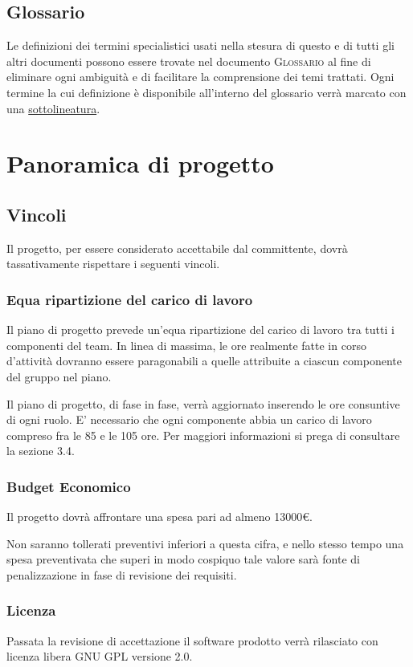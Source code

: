 \documentclass[11pt,a4paper]{article}
\begin{document}
\subsection{Glossario}
Le definizioni dei termini specialistici usati nella stesura di questo e di tutti gli altri documenti possono essere trovate nel documento \textsc{Glossario} al fine di eliminare ogni ambiguità e di facilitare la comprensione dei temi trattati. Ogni termine la cui definizione è disponibile all'interno del glossario verrà marcato con una \underline{sottolineatura}.
\section{Panoramica di progetto}
\subsection{Vincoli}
Il progetto, per essere considerato accettabile dal committente, dovrà tassativamente rispettare i seguenti vincoli.
\subsubsection{Equa ripartizione del carico di lavoro}
Il piano di progetto prevede un'equa ripartizione del carico di lavoro tra tutti i componenti del team.
In linea di massima, le ore realmente fatte in corso d'attività dovranno essere paragonabili a quelle attribuite a ciascun componente del gruppo nel piano.

Il piano di progetto, di fase in fase, verrà aggiornato inserendo le ore consuntive di ogni ruolo.
E' necessario che ogni componente abbia un carico di lavoro compreso fra le 85 e le 105 ore. Per maggiori informazioni si prega di consultare la sezione 3.4.
\subsubsection{Budget Economico}
Il progetto dovrà affrontare una spesa pari ad almeno 13000\euro.

Non saranno tollerati preventivi inferiori a questa cifra, e nello stesso tempo una spesa preventivata che superi in modo cospiquo tale valore sarà fonte di penalizzazione in fase di revisione dei requisiti.
\subsubsection{Licenza}
Passata la revisione di accettazione il software prodotto verrà rilasciato con licenza libera GNU GPL versione 2.0.
\end{document}
